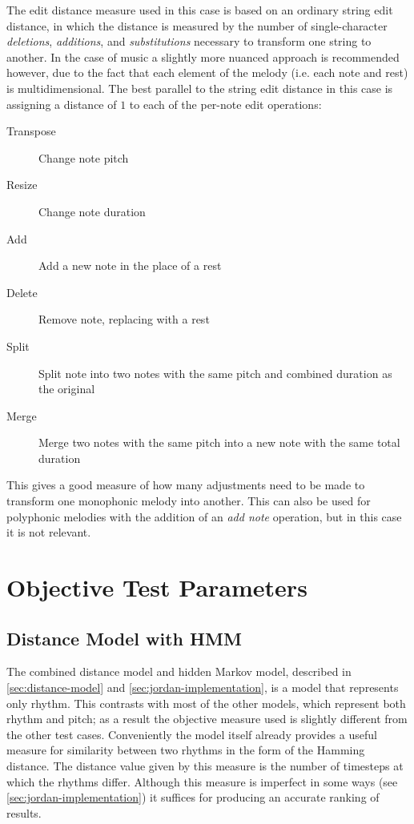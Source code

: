 \documentclass[ author={Stephen Livermore-Tozer},
				supervisor={Dr. Peter Flach},
				degree={MEng},
				title={Algorithmic Co-composition Using Machine Learning},
				subtitle={},
				type={research},
				year={2016} ]{dissertation}
\begin{document}
	The edit distance measure used in this case is based on an ordinary string edit distance, in which the distance is measured by the number of single-character \textit{deletions}, \textit{additions}, and \textit{substitutions} necessary to transform one string to another. In the case of music a slightly more nuanced approach is recommended however, due to the fact that each element of the melody (i.e. each note and rest) is multidimensional. The best parallel to the string edit distance in this case is assigning a distance of $1$ to each of the per-note edit operations:
	\begin{description}
		\item[Transpose] Change note pitch
		\item[Resize] Change note duration
		\item[Add] Add a new note in the place of a rest
		\item[Delete] Remove note, replacing with a rest
		\item[Split] Split note into two notes with the same pitch and combined duration as the original
		\item[Merge] Merge two notes with the same pitch into a new note with the same total duration
	\end{description}
	This gives a good measure of how many adjustments need to be made to transform one monophonic melody into another. This can also be used for polyphonic melodies with the addition of an \textit{add note} operation, but in this case it is not relevant.
	
	\section{Objective Test Parameters}
	
	\subsection{Distance Model with HMM}
	
	The combined distance model and hidden Markov model, described in \ref{sec:distance-model} and \ref{sec:jordan-implementation}, is a model that represents only rhythm. This contrasts with most of the other models, which represent both rhythm and pitch; as a result the objective measure used is slightly different from the other test cases. Conveniently the model itself already provides a useful measure for similarity between two rhythms in the form of the Hamming distance. The distance value given by this measure is the number of timesteps at which the rhythms differ. Although this measure is imperfect in some ways (see \ref{sec:jordan-implementation}) it suffices for producing an accurate ranking of results.
	
\end{document}
